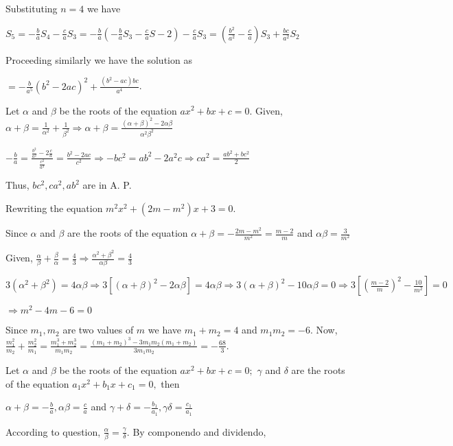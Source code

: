  Substituting $n = 4$ we have

  $S_5 = -\frac{b}{a}S_4 - \frac{c}{a}S_3 = -\frac{b}{a}(-\frac{b}{a}S_3 - \frac{c}{a}S-2) - \frac{c}{a}S_3
  = \left(\frac{b^2}{a^2} - \frac{c}{a}\right)S_3 + \frac{bc}{a^2}S_2$

  Proceeding similarly we have the solution as

  $= -\frac{b}{a^5}(b^2 - 2ac)^2 + \frac{(b^2 - ac)bc}{a^4}$.
\item Let $\alpha$ and $\beta$ be the roots of the equation $ax^2 + bx + c = 0$. Given, $\alpha + \beta =
  \frac{1}{\alpha^2} + \frac{1}{\beta^2}\Rightarrow \alpha + \beta = \frac{(\alpha + \beta)^2 -
    2\alpha\beta}{\alpha^2\beta^2}$

  $-\frac{b}{a} = \frac{\frac{b^2}{a^2} - 2\frac{c}{a}}{\frac{c^2}{a^2}} = \frac{b^2 - 2ac}{c^2}\Rightarrow
  -bc^2 = ab^2 - 2a^2c \Rightarrow ca^2 = \frac{ab^2 + bc^2}{2}$

  Thus, $bc^2, ca^2, ab^2$ are in A. P.
\item Rewriting the equation $m^2x^2 + (2m - m^2)x + 3 = 0$.

  Since $\alpha$ and $\beta$ are the roots of the equation $\alpha + \beta = -\frac{2m - m^2}{m^2} = \frac{m -
    2}{m}$ and $\alpha\beta = \frac{3}{m^2}$

  Given, $\frac{\alpha}{\beta} + \frac{\beta}{\alpha} = \frac{4}{3} \Rightarrow \frac{\alpha^2 + \beta^2}{\alpha\beta} =
  \frac{4}{3}$

  $3(\alpha^2 + \beta^2) = 4\alpha\beta \Rightarrow 3[(\alpha + \beta)^2 - 2\alpha\beta] =
  4\alpha\beta\Rightarrow 3(\alpha + \beta)^2 - 10\alpha\beta = 0 \Rightarrow 3\left[\left(\frac{m -
      2}{m}\right)^2 - \frac{10}{m^2}\right] = 0$

  $\Rightarrow m^2 - 4m - 6 = 0$

  Since $m_1, m_2$ are two values of $m$ we have $m_1 + m_2 = 4$ and $m_1m_2 = -6$. Now, $\frac{m_1^2}{m_2}
  + \frac{m_2^2}{m_1} = \frac{m_1^3 + m_2^3}{m_1m_2} = \frac{(m_1 + m_2)^3 - 3m_1m_2(m_1 + m_2)}{3m_1m_2} =
  -\frac{68}{3}$.
\item Let $\alpha$ and $\beta$ be the roots of the equation $ax^2 + bx + c = 0;$ $\gamma$ and $\delta$
  are the roots of the equation $a_1x^2 + b_1x + c_1 = 0,$ then

  $\alpha + \beta = -\frac{b}{a}, \alpha\beta = \frac{c}{a}$ and $\gamma + \delta = -\frac{b_1}{a_1},
  \gamma\delta = \frac{c_1}{a_1}$

  According to question, $\frac{\alpha}{\beta} = \frac{\gamma}{\delta}$. By componendo and dividendo,

